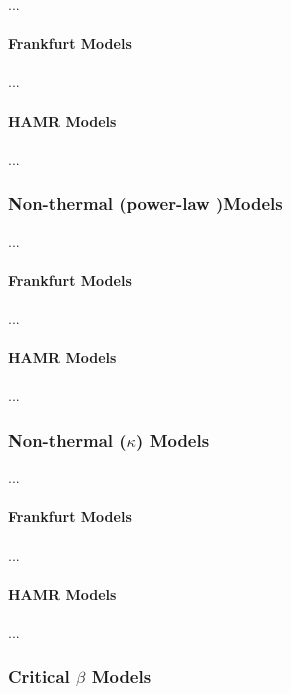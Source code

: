 \documentclass[twocolumn,twocolappendix,tighten,dvipsnames,linenumbers]{aastex63}
\begin{document}
...

\paragraph{Frankfurt Models}

...

\paragraph{HAMR Models}

...

\subsubsection{Non-thermal (power-law )Models}

...

\paragraph{Frankfurt Models}

...

\paragraph{HAMR Models}

...

\subsubsection{Non-thermal ($\kappa$) Models}

...

\paragraph{Frankfurt Models}

...

\paragraph{HAMR Models}

...

\subsubsection{Critical $\beta$ Models}
\end{document}
